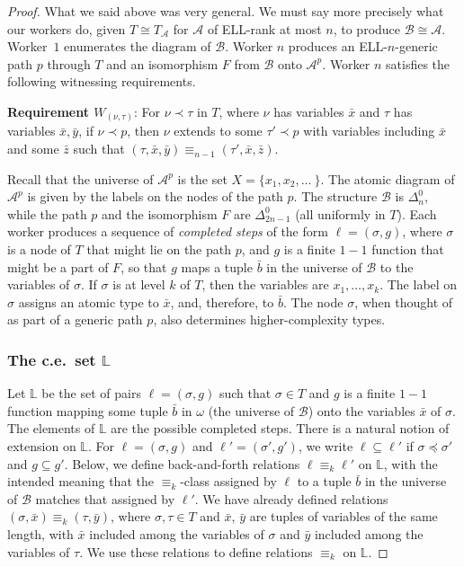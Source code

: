 \documentclass{article}
\newcommand{\ELL}{\textnormal{ELL}}
\theoremstyle{definition}
\begin{document}
\begin{proof}
		What we said above was very general. We must say more precisely what our workers do, given $T\cong T_\mathcal{A}$ for $\mathcal{A}$ of \ELL-rank at most $n$, to produce $\mathcal{B}\cong \mathcal{A}$. Worker~$1$ enumerates the diagram of $\mathcal{B}$. Worker $n$ produces an \ELL-$n$-generic path $p$ through $T$ and an isomorphism $F$ from $\mathcal{B}$ onto $\mathcal{A}^p$. Worker $n$ satisfies the following witnessing requirements.
		

\bigskip
\noindent
\textbf{Requirement $W_{(\nu,\tau)}$}:  For $\nu\prec\tau$ in $T$, where $\nu$ has variables $\bar{x}$ and $\tau$ has variables $\bar{x},\bar{y}$, if $\nu\prec p$, then $\nu$ extends to some $\tau'\prec p$ with variables including $\bar{x}$ and some $\bar{z}$ such that $(\tau,\bar{x},\bar{y})\equiv_{n-1}(\tau',\bar{x},\bar{z})$. 
		
\bigskip
Recall that the universe of $\mathcal{A}^p$ is the set $X = \{x_1,x_2,\ldots\ \}$. The atomic diagram of $\mathcal{A}^p$ is given by the labels on the nodes of the path $p$. The structure $\mathcal{B}$ is $\Delta^0_n$, while the path $p$ and the isomorphism $F$ are $\Delta^0_{2n-1}$ (all uniformly in $T$). Each worker produces a sequence of \emph{completed steps} of the form $\ell = (\sigma,g)$, where $\sigma$ is a node of $T$ that might lie on the path $p$, and $g$ is a finite $1-1$ function that might be a part of $F$, so that $g$ maps a tuple $\bar{b}$ in the universe of $\mathcal{B}$ to the variables of $\sigma$. If $\sigma$ is at level $k$ of $T$, then the variables are $x_1,\ldots,x_k$. The label on $\sigma$ assigns an atomic type to $\bar{x}$, and, therefore, to $\bar{b}$. The node $\sigma$, when thought of as part of a generic path $p$, also determines higher-complexity types. 
		
		\subsubsection{The c.e.\ set $\mathbb{L}$}
		
		Let $\mathbb{L}$ be the set of pairs $\ell = (\sigma,g)$ such that $\sigma\in T$ and $g$ is a finite $1-1$ function mapping some tuple $\bar{b}$ in $\omega$ (the universe of $\mathcal{B}$) onto the variables $\bar{x}$ of $\sigma$. The elements of $\mathbb{L}$ are the possible completed steps. There is a natural notion of extension on $\mathbb{L}$. For $\ell = (\sigma,g)$ and $\ell' = (\sigma',g')$, we write $\ell\subseteq\ell'$ if $\sigma\preceq\sigma'$ and $g\subseteq g'$. Below, we define back-and-forth relations $\ell\equiv_k\ell'$ on $\mathbb{L}$, with the intended meaning that the $\equiv_k$-class assigned by $\ell$ to a tuple $\bar{b}$ in the universe of $\mathcal{B}$ matches that assigned by $\ell'$. We have already defined relations $(\sigma,\bar{x})\equiv_k(\tau,\bar{y})$, where $\sigma,\tau\in T$ and $\bar{x}$, $\bar{y}$ are tuples of variables of the same length, with $\bar{x}$ included among the variables of $\sigma$ and $\bar{y}$ included among the variables of $\tau$. We use these relations to define relations $\equiv_k$ on $\mathbb{L}$. 
		

\end{proof}
\end{document}
